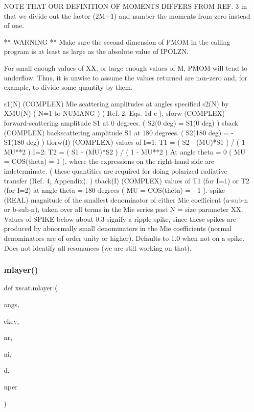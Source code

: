 \begin{DoxyVerb}
               NOTE THAT OUR DEFINITION OF MOMENTS DIFFERS FROM REF. 3
               in that we divide out the factor (2M+1) and number the
               moments from zero instead of one.

               ** WARNING **  Make sure the second dimension of PMOM
               in the calling program is at least as large as the
               absolute value of IPOLZN.

               For small enough values of XX, or large enough values
               of M,  PMOM  will tend to underflow.  Thus, it is
               unwise to assume the values returned are non-zero and,
               for example, to divide some quantity by them.


    s1(N)      (COMPLEX) Mie scattering amplitudes at angles specified
    s2(N)      by XMU(N) ( N=1 to NUMANG )  ( Ref. 2, Eqs. 1d-e ).
    sforw      (COMPLEX) forward-scattering amplitude S1 at
               0 degrees.  ( S2(0 deg) = S1(0 deg) )
    sback      (COMPLEX) backscattering amplitude S1 at
               180 degrees.   ( S2(180 deg) = - S1(180 deg) )
    tforw(I)   (COMPLEX) values of
                I=1:  T1 = ( S2 - (MU)*S1 ) / ( 1 - MU**2 )
                I=2:  T2 = ( S1 - (MU)*S2 ) / ( 1 - MU**2 )
               At angle theta = 0 ( MU = COS(theta) = 1 ), where the
               expressions on the right-hand side are indeterminate.
               ( these quantities are required for doing polarized
               radiative transfer (Ref. 4, Appendix). )
    tback(I)   (COMPLEX) values of  T1 (for I=1) or  T2 (for I=2) at
               angle  theta = 180 degrees ( MU = COS(theta) = - 1 ).
    spike      (REAL) magnitude of the smallest denominator of
               either Mie coefficient (a-sub-n or b-sub-n),
               taken over all terms in the Mie series past
               N = size parameter XX.  Values of SPIKE below
               about 0.3 signify a ripple spike, since these
               spikes are produced by abnormally small denominators
               in the Mie coefficients (normal denominators are of
               order unity or higher).  Defaults to 1.0 when not
               on a spike.  Does not identify all resonances
               (we are still working on that).
\end{DoxyVerb}
 \mbox{\label{namespacexscat_a899176101273a6394bc42bbbd49a80b0}} 
\subsubsection{\texorpdfstring{mlayer()}{mlayer()}}
{\footnotesize\ttfamily def xscat.\+mlayer (\begin{DoxyParamCaption}\item[{}]{angs,  }\item[{}]{ekev,  }\item[{}]{nr,  }\item[{}]{ni,  }\item[{}]{d,  }\item[{}]{nper }\end{DoxyParamCaption})}

